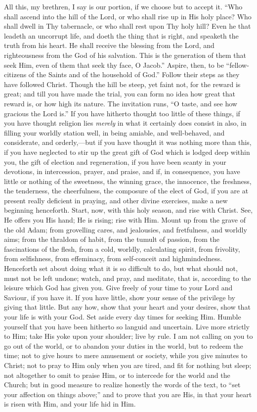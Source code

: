 All this, my brethren, I say is our portion, if we choose but to
accept it. ``Who shall ascend into the hill of the Lord, or who
shall rise up in His holy place? Who shall dwell in Thy tabernacle, or
who shall rest upon Thy holy hill? Even he that leadeth an uncorrupt
life, and doeth the thing that is right, and speaketh the truth from
his heart. He shall receive the blessing from the Lord, and
righteousness from the God of his salvation. This is the generation of
them that seek Him, even of them that seek thy face, O Jacob.''
Aspire, then, to be ``fellow-citizens of the Saints and of the
household of God.'' Follow their steps as they have followed
Christ. Though the hill be steep, yet faint not, for the reward is
great; and till you have made the trial, you can form no idea how
great that reward is, or how high its nature. The invitation runs,
``O taste, and see how gracious the Lord is.'' If you have
hitherto thought too little of these things, if you have thought
religion lies \emph{merely} in what it certainly does consist in also,
in filling your worldly station well, in being amiable, and
well-behaved, and considerate, and orderly,—but if you have thought
it was nothing more than this, if you have neglected to stir up the
great gift of God which is lodged deep within you, the gift of
election and regeneration, if you have been scanty in your devotions,
in intercession, prayer, and praise, and if, in consequence, you have
little or nothing of the sweetness, the winning grace, the innocence,
the freshness, the tenderness, the cheerfulness, the composure of the
elect of God, if you are at present really deficient in praying, and
other divine exercises, make a new beginning henceforth. Start, now,
with this holy season, and rise with Christ. See, He offers you His
hand; He is rising; rise with Him. Mount up from the grave of the old
Adam; from grovelling cares, and jealousies, and fretfulness, and
worldly aims; from the thraldom of habit, from the tumult of passion,
from the fascinations of the flesh, from a cold, worldly, calculating
spirit, from frivolity, from selfishness, from effeminacy, from
self-conceit and highmindedness. Henceforth set about doing what it is
so difficult to do, but what should not, must not be left undone;
watch, and pray, and meditate, that is, according to the leisure which
God has given you. Give freely of your time to your Lord and Saviour,
if you have it. If you have little, show your sense of the privilege
by giving that little. But any how, show that your heart and your
desires, show that your life is with your God. Set aside every day
times for seeking Him. Humble yourself that you have been hitherto so
languid and uncertain. Live more strictly to Him; take His yoke upon
your shoulder; live by rule. I am not calling on you to go out of the
world, or to abandon your duties in the world, but to redeem the time;
not to give hours to mere amusement or society, while you give minutes
to Christ; not to pray to Him only when you are tired, and fit for
nothing but sleep; not altogether to omit to praise Him, or to
intercede for the world and the Church; but in good measure to realize
honestly the words of the text, to ``set your affection on things
above;'' and to prove that you are His, in that your heart is
risen with Him, and your life hid in Him.

